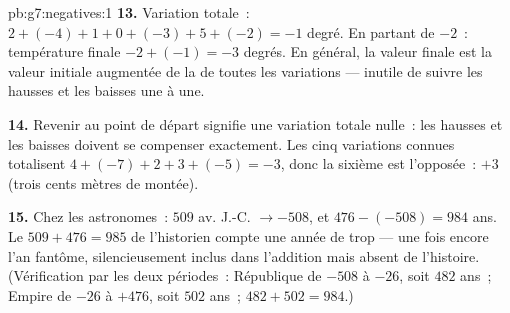 \begin{solution}{pb:g7:negatives:1}
\textbf{13.} Variation totale~:
$2 + (-4) + 1 + 0 + (-3) + 5 + (-2) = -1$ degré. En partant de
$-2$~: température finale $-2 + (-1) = -3$ degrés. En général, la
valeur finale est la valeur initiale augmentée de la  de toutes
les variations --- inutile de suivre les hausses et les baisses une
à une.

\textbf{14.} Revenir au point de départ signifie une variation
totale nulle~: les hausses et les baisses doivent se compenser
exactement. Les cinq variations connues totalisent
$4 + (-7) + 2 + 3 + (-5) = -3$, donc la sixième est l'opposée~:
$+3$ (trois cents mètres de montée).

\textbf{15.} Chez les astronomes~: $509$ av. J.-C. $\to -508$, et
$476 - (-508) = 984$ ans. Le $509 + 476 = 985$ de l'historien compte
une année de trop --- une fois encore l'an  fantôme,
silencieusement inclus dans l'addition mais absent de l'histoire.
(Vérification par les deux périodes~: République de $-508$ à $-26$,
soit $482$ ans~; Empire de $-26$ à $+476$, soit $502$ ans~;
$482 + 502 = 984$.)
\end{solution}

